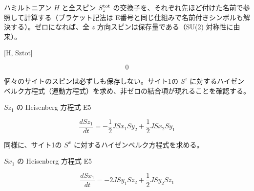 \documentclass[dvipdfmx,a4paper,11pt]{jsarticle}
\begin{document}
ハミルトニアン $H$ と全スピン $S_z^{\rm tot}$ の交換子を、それぞれ先ほど付けた名前で参照して計算する（ブラケット記法は E番号と同じ仕組みで名前付きシンボルも解決する）。ゼロになれば、全 $z$ 方向スピンは保存量である（SU(2) 対称性に由来）。

[H, Sztot]

\begin{equation}
  0
  \label{eq:E7}
\end{equation}

個々のサイトのスピンは必ずしも保存しない。サイト1の $S^z$ に対するハイゼンベルク方程式（運動方程式）を求め、非ゼロの結合項が現れることを確認する。

$Sz_1$ の Heisenberg 方程式 E5

\begin{equation}
  \frac{d Sz_1}{d t} = - \frac{1}{2} J Sx_1 Sy_2 + \frac{1}{2} J Sx_2 Sy_1
  \label{eq:E8}
\end{equation}

同様に、サイト1の $S^x$ に対するハイゼンベルク方程式を求める。

$Sx_1$ の Heisenberg 方程式 E5

\begin{equation}
  \frac{d Sx_1}{d t} = - 2 J Sy_1 Sz_2 + \frac{1}{2} J Sy_2 Sz_1
  \label{eq:E9}
\end{equation}
\end{document}
